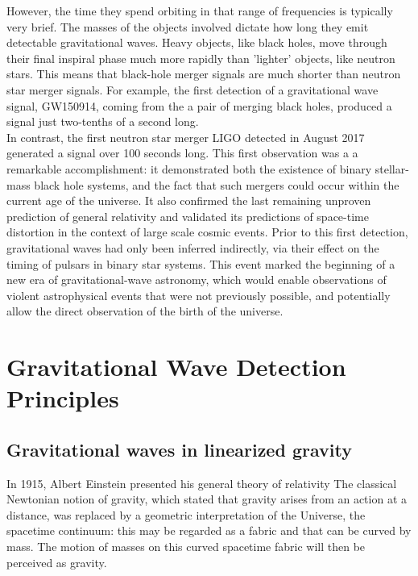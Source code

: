 \documentclass[binding=0.6cm, LaM]{sapthesis}
\begin{document}
	However, the time they spend orbiting in that range of frequencies is typically very brief.
        The masses of the objects involved dictate how long they emit detectable gravitational waves. 
        Heavy objects, like black holes, move through their final inspiral phase much more rapidly than 'lighter' objects, 
        like neutron stars. This means that black-hole merger signals are much shorter than neutron star merger signals.
        For example, the first detection of a gravitational wave signal, GW150914, coming from the a pair of merging black holes, 
	produced a signal just two-tenths of a second long. \\
        In contrast, the first neutron star merger LIGO detected in August 2017 generated a signal over 100 seconds long.
	This first observation was a a remarkable accomplishment: it demonstrated both the existence of binary stellar-mass black hole systems, 
	and the fact that such mergers could occur within the current age of the universe.  
	It also confirmed the last remaining unproven prediction of general relativity and validated 
	its predictions of space-time distortion in the context of large scale cosmic events. 
	Prior to this first detection, gravitational waves had only been inferred indirectly,
        via their effect on the timing of pulsars in binary star systems.
	This event  marked the beginning of a new era of gravitational-wave astronomy, 
	which would enable observations of violent astrophysical events that were not previously possible, 
	and potentially allow the direct observation of the birth of the universe.


\chapter{Gravitational Wave Detection Principles}
\section{Gravitational waves in linearized gravity}

	In 1915, Albert Einstein presented his general theory of relativity
	The classical Newtonian notion of gravity, which stated that gravity arises from an 
	action at a distance, was replaced by a geometric interpretation of the Universe, 
	the spacetime continuum: this may be regarded as a fabric and that can be curved 
	by mass. 
	The motion of masses on this curved spacetime fabric will then be perceived as gravity. \\
\end{document}
